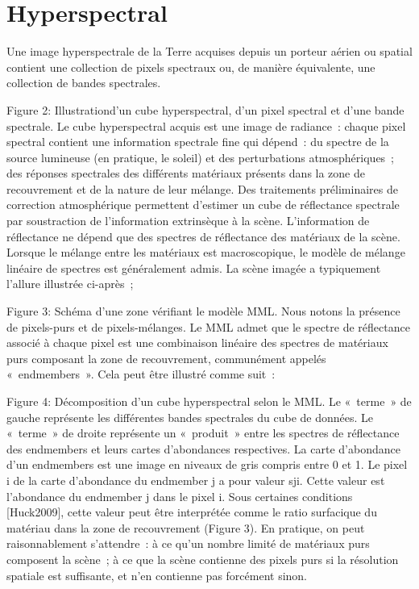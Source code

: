 \chapter{Hyperspectral}

Une image hyperspectrale de la Terre acquises depuis un porteur aérien ou spatial contient une collection de pixels spectraux ou, de manière équivalente, une collection de bandes spectrales.

Figure 2: Illustrationd’un cube hyperspectral, d'un pixel spectral et d'une bande spectrale.
Le cube hyperspectral acquis est une image de radiance : chaque pixel spectral contient une information spectrale fine qui dépend :
du spectre de la source lumineuse (en pratique, le soleil) et des perturbations atmosphériques ;
des réponses spectrales des différents matériaux présents dans la zone de recouvrement et de la nature de leur mélange.
Des traitements préliminaires de correction atmosphérique permettent d’estimer un cube de réflectance spectrale par soustraction de l’information extrinsèque à la scène. L’information de réflectance ne dépend que des spectres de réflectance des matériaux de la scène. Lorsque le mélange entre les matériaux est macroscopique, le modèle de mélange linéaire de spectres est généralement admis. La scène imagée a typiquement l’allure illustrée ci-après ;

Figure 3: Schéma d'une zone vérifiant le modèle MML.
Nous notons la présence de pixels-purs et de pixels-mélanges. Le MML admet que le spectre de réflectance associé à chaque pixel est une combinaison linéaire des spectres de matériaux purs composant la zone de recouvrement, communément appelés « endmembers ». Cela peut être illustré comme suit :


Figure 4: Décomposition d'un cube hyperspectral selon le MML.
Le « terme » de gauche représente les différentes bandes spectrales du cube de données. Le « terme » de droite représente un « produit » entre les spectres de réflectance des endmembers et leurs cartes d’abondances respectives. La carte d’abondance d’un endmembers est une image en niveaux de gris compris entre 0 et 1. Le pixel i de la carte d’abondance du endmember j a pour valeur sji. Cette valeur est l’abondance du endmember j dans le pixel i. Sous certaines conditions [Huck2009], cette valeur peut être interprétée comme le ratio surfacique du matériau dans la zone de recouvrement (Figure 3).
En pratique, on peut raisonnablement s’attendre :
à ce qu’un nombre limité de matériaux purs composent la scène ;
à ce que la scène contienne des pixels purs si la résolution spatiale est suffisante, et n’en contienne pas forcément sinon.

